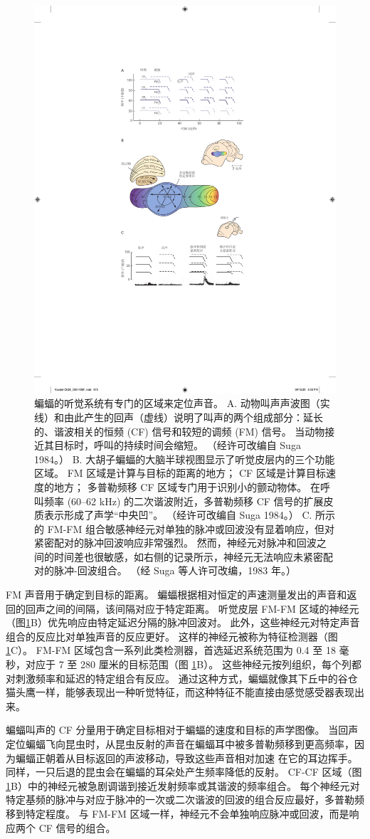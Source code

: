\begin{figure}[htbp]
	\centering
	\includegraphics[width=0.5\linewidth]{chap28/fig_28_14}
	\caption{蝙蝠的听觉系统有专门的区域来定位声音。 
		A. 动物叫声声波图（实线）和由此产生的回声（虚线）说明了叫声的两个组成部分：延长的、谐波相关的恒频 (CF) 信号和较短的调频 (FM) 信号。 
		当动物接近其目标时，呼叫的持续时间会缩短。 （经许可改编自 Suga 1984。） 
		B. 大胡子蝙蝠的大脑半球视图显示了听觉皮层内的三个功能区域。 FM 区域是计算与目标的距离的地方； CF 区域是计算目标速度的地方； 多普勒频移 CF 区域专门用于识别小的颤动物体。 
		在呼叫频率 (60–62 kHz) 的二次谐波附近，多普勒频移 CF 信号的扩展皮质表示形成了声学“中央凹”。 （经许可改编自 Suga 1984。）
		C. 所示的 FM-FM 组合敏感神经元对单独的脉冲或回波没有显着响应，但对紧密配对的脉冲回波响应非常强烈。 
		然而，神经元对脉冲和回波之间的时间差也很敏感，如右侧的记录所示，神经元无法响应未紧密配对的脉冲-回波组合。 （经 Suga 等人许可改编，1983 年。）}
	\label{fig:28_14}
\end{figure}


FM 声音用于确定到目标的距离。 
蝙蝠根据相对恒定的声速测量发出的声音和返回的回声之间的间隔，该间隔对应于特定距离。 
听觉皮层 FM-FM 区域的神经元（图\ref{fig:28_14}B）优先响应由特定延迟分隔的脉冲回波对。 
此外，这些神经元对特定声音组合的反应比对单独声音的反应更好。 
这样的神经元被称为特征检测器（图 \ref{fig:28_14}C）。 
FM-FM 区域包含一系列此类检测器，首选延迟系统范围为 0.4 至 18 毫秒，对应于 7 至 280 厘米的目标范围（图  \ref{fig:28_14}B）。 
这些神经元按列组织，每个列都对刺激频率和延迟的特定组合有反应。 
通过这种方式，蝙蝠就像其下丘中的谷仓猫头鹰一样，能够表现出一种听觉特征，而这种特征不能直接由感觉感受器表现出来。


蝙蝠叫声的 CF 分量用于确定目标相对于蝙蝠的速度和目标的声学图像。 
当回声定位蝙蝠飞向昆虫时，从昆虫反射的声音在蝙蝠耳中被多普勒频移到更高频率，因为蝙蝠正朝着从目标返回的声波移动，导致这些声音相对加速 在它的耳边挥手。 
同样，一只后退的昆虫会在蝙蝠的耳朵处产生频率降低的反射。 
CF-CF 区域（图  \ref{fig:28_14}B）中的神经元被急剧调谐到接近发射频率或其谐波的频率组合。 
每个神经元对特定基频的脉冲与对应于脉冲的一次或二次谐波的回波的组合反应最好，多普勒频移到特定程度。 
与 FM-FM 区域一样，神经元不会单独响应脉冲或回波，而是响应两个 CF 信号的组合。

